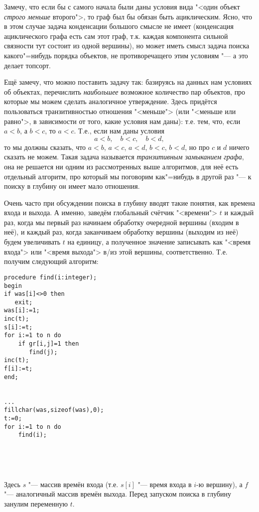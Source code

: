 Замечу, что если бы с самого начала были даны условия вида "<один объект \textit{строго меньше} второго">, то 
граф был бы обязан быть ациклическим. Ясно, что в этом случае задача конденсации большого смысле не имеет (конденсация
ациклического графа есть сам этот граф, т.к. каждая компонента сильной связности тут состоит из одной вершины), но может
иметь смысл задача поиска какого"=нибудь порядка объектов, не противоречащего этим условиям "--- а это делает топсорт.

Ещё замечу, что можно поставить задачу так: базируясь на данных нам условиях об объектах, перечислить 
\textit{наибольшее} возможное количество пар объектов, про которые мы можем сделать аналогичное утверждение.
Здесь придётся пользоваться транзитивностью отношения "<меньше"> (или "<меньше или равно">, в зависимости от того,
какие условия нам даны): т.е. тем, что, если $a<b$, а $b<c$, то $a<c$. Т.е., если нам даны условия
$$
a<b,\quad b<c,\quad b<d,
$$
то мы должны сказать, что $a<b$, $a<c$, $a<d$, $b<c$, $b<d$, но про $c$ и $d$ ничего сказать не можем. Такая задача
называется \textit{транзитивным замыканием графа}, она не решается ни одним из рассмотренных выше алгоритмов, для
неё есть отдельный алгоритм, про который мы поговорим как"=нибудь в другой раз "--- к поиску в глубину он имеет
мало отношения.

Очень часто при обсуждении поиска в глубину вводят такие понятия, как времена входа и выхода. А именно, заведём 
глобальный счётчик "<времени"> $t$ и каждый раз, когда мы первый раз начинаем обработку очередной вершины (входим
в неё), и каждый раз, когда заканчиваем обработку вершины (выходим из неё) будем увеличивать $t$ на единицу, а 
полученное значение записывать как "<время входа"> или "<время выхода"> в/из этой вершины, соответственно.
Т.е. получим следующий алгоритм:
\begin{codesample}\begin{verbatim}
procedure find(i:integer);
begin
if was[i]<>0 then
   exit;
was[i]:=1;
inc(t);
s[i]:=t;
for i:=1 to n do
    if gr[i,j]=1 then
       find(j);
inc(t);
f[i]:=t;
end;


...
fillchar(was,sizeof(was),0);
t:=0;
for i:=1 to n do
    find(i);





\end{verbatim}\end{codesample}
Здесь $s$ "--- массив времён входа (т.е. $s[i]$ "--- время входа в $i$-ю вершину), а $f$ "--- аналогичный массив времён выхода. Перед запуском поиска в глубину занулим переменную $t$. 

